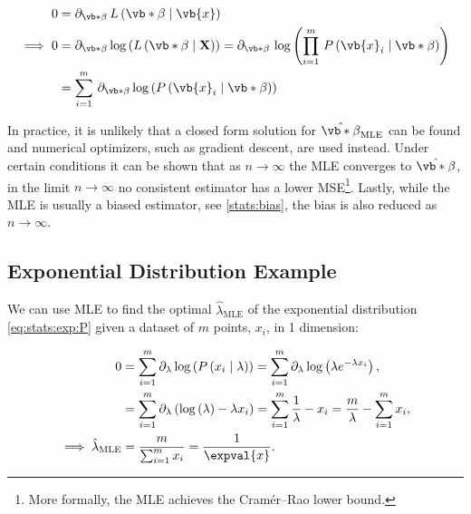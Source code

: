 \begin{subequations}\label{eq:MLE}
\begin{align}
0 &= \partial_{\vb*{\beta}} \, L\left(\vb*{\beta} \mid \vb{x}\right) \label{eq:MLE:L} \\
\implies 0 &= \partial_{\vb*{\beta}} \log\left(L\left(\vb*{\beta} \mid \mathbf{X}\right)\right) = \partial_{\vb*{\beta}} \, \log\left(\prod_{i=1}^{m} \, P\left(\vb{x}_{i} \mid \vb*{\beta}\right)\right) \label{eq:MLE:log_L} \\
&= \sum_{i=1}^{m} \, \partial_{\vb*{\beta}} \log\left(P\left(\vb{x}_{i} \mid \vb*{\beta}\right)\right) \label{eq:MLE:log_L_sum}
\end{align}
\end{subequations}

In practice, it is unlikely that a closed form solution for $\hat{\vb*{\beta}}_{\text{MLE}}$ can be found
and numerical optimizers, such as gradient descent, are used instead.
Under certain conditions it can be shown that as $n \to \infty$ the MLE converges to $\hat{\vb*{\beta}}$,
\ie in the limit $n \to \infty$ no consistent estimator
has a lower MSE\footnote{More formally, the MLE achieves the Cram\'er--Rao lower bound.}.
Lastly, while the MLE is usually a biased estimator, see \cref{stats:bias},
the bias is also reduced as $n \to \infty$.

\subsection{Exponential Distribution Example}
\label{opt:MLE:exp_ex}

We can use MLE to find the optimal $\hat{\lambda}_{\text{MLE}}$ of
the exponential distribution \cref{eq:stats:exp:P}
given a dataset of $m$ points, $x_{i}$, in 1 dimension:

\begin{subequations}\label{eq:MLE:exp_ex}
\begin{align}
0 &= \sum_{i=1}^{m} \partial_{\lambda} \log\left(P\left(x_{i} \mid \lambda\right)\right) = \sum_{i=1}^{m} \partial_{\lambda} \log\left(\lambda e^{-\lambda x_{i}}\right), \label{eq:MLE:exp_ex:log_L_sum} \\
&= \sum_{i=1}^{m}\partial_{\lambda} \left( \log\left(\lambda\right) -\lambda x_{i}\right) = \sum_{i=1}^{m} \frac{1}{\lambda} - x_{i} = \frac{m}{\lambda} - \sum_{i=1}^{m} x_{i}, \label{eq:MLE:exp_ex:solve} \\
\implies \hat{\lambda}_{\text{MLE}} &= \frac{m}{\sum_{i=1}^{m} x_{i}} = \frac{1}{\expval{x}}. \label{eq:MLE:exp_ex:lambda}
\end{align}
\end{subequations}

